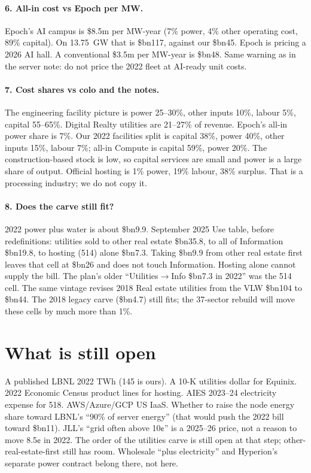 \documentclass[11pt]{article}
\newcommand{\bn}{\$bn}
\begin{document}
\paragraph{6. All-in cost vs Epoch per MW.}
Epoch's AI campus is \$8.5m per MW-year (7\% power, 4\% other operating cost, 89\% capital). On 13.75~GW that is \bn117, against our \bn45. Epoch is pricing a 2026 AI hall. A conventional \$3.5m per MW-year is \bn48. Same warning as in the server note: do not price the 2022 fleet at AI-ready unit costs.

\paragraph{7. Cost shares vs colo and the notes.}
The engineering facility picture is power 25--30\%, other inputs 10\%, labour 5\%, capital 55--65\%. Digital Realty utilities are 21--27\% of revenue. Epoch's all-in power share is 7\%. Our 2022 facilities split is capital 38\%, power 40\%, other inputs 15\%, labour 7\%; all-in Compute is capital 59\%, power 20\%. The construction-based stock is low, so capital services are small and power is a large share of output. Official hosting is 1\% power, 19\% labour, 38\% surplus. That is a processing industry; we do not copy it.

\paragraph{8. Does the carve still fit?}
2022 power plus water is about \bn9.9. September 2025 Use table, before redefinitions: utilities sold to other real estate \bn35.8, to all of Information \bn19.8, to hosting (514) alone \bn7.3. Taking \bn9.9 from other real estate first leaves that cell at \bn26 and does not touch Information. Hosting alone cannot supply the bill. The plan's older ``Utilities$\to$Info \bn7.3 in 2022'' was the 514 cell. The same vintage revises 2018 Real estate utilities from the VLW \bn104 to \bn44. The 2018 legacy carve (\bn4.7) still fits; the 37-sector rebuild will move these cells by much more than 1\%.

\section{What is still open}

A published LBNL 2022 TWh (145 is ours). A 10-K utilities dollar for Equinix. 2022 Economic Census product lines for hosting. AIES 2023--24 electricity expense for 518. AWS/Azure/GCP US IaaS. Whether to raise the node energy share toward LBNL's ``90\% of server energy'' (that would push the 2022 bill toward \bn11). JLL's ``grid often above 10¢'' is a 2025--26 price, not a reason to move 8.5¢ in 2022. The order of the utilities carve is still open at that step; other-real-estate-first still has room. Wholesale ``plus electricity'' and Hyperion's separate power contract belong there, not here.
\end{document}
